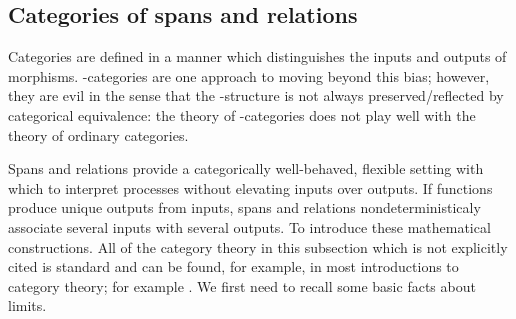 
\subsection{Categories of spans and relations}
Categories are defined in a manner which distinguishes the inputs and outputs of morphisms.  \dag-categories are one approach to moving beyond this bias; however, they are evil in the sense that the \dag-structure is not always preserved/reflected by categorical equivalence: the theory of \dag-categories does not play well with the theory of ordinary categories.  

Spans and relations provide a categorically well-behaved, flexible setting with which to interpret processes without elevating inputs over outputs.
If functions produce unique outputs from inputs, spans and relations nondeterministicaly associate several inputs with several outputs.  To introduce these mathematical constructions.
All of the category theory in this subsection which is not explicitly cited is standard and can be found, for example, in most introductions to category theory; for example \cite{maclane}.
We first need to recall some basic facts about limits.
